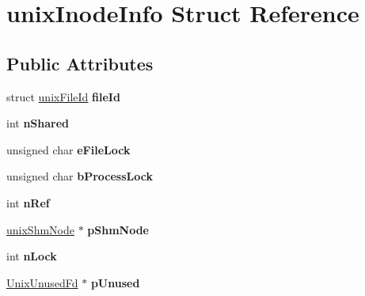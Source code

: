 \hypertarget{structunix_inode_info}{\section{unix\-Inode\-Info Struct Reference}
\label{structunix_inode_info}
}
\subsection*{Public Attributes}
\begin{DoxyCompactItemize}
\item 
\hypertarget{structunix_inode_info_ae692731d449f4462a921dda9a061faa6}{struct \hyperlink{structunix_file_id}{unix\-File\-Id} {\bfseries file\-Id}}\label{structunix_inode_info_ae692731d449f4462a921dda9a061faa6}

\item 
\hypertarget{structunix_inode_info_a0d7f8dd92964f53e59c8d741dbe00a61}{int {\bfseries n\-Shared}}\label{structunix_inode_info_a0d7f8dd92964f53e59c8d741dbe00a61}

\item 
\hypertarget{structunix_inode_info_a010a765bb3feecb16b650f68fc3a3c1f}{unsigned char {\bfseries e\-File\-Lock}}\label{structunix_inode_info_a010a765bb3feecb16b650f68fc3a3c1f}

\item 
\hypertarget{structunix_inode_info_ade689e4231dd80bb33c86da1e5ed1586}{unsigned char {\bfseries b\-Process\-Lock}}\label{structunix_inode_info_ade689e4231dd80bb33c86da1e5ed1586}

\item 
\hypertarget{structunix_inode_info_a65cbd1fd05ed00f03a252266b04a8221}{int {\bfseries n\-Ref}}\label{structunix_inode_info_a65cbd1fd05ed00f03a252266b04a8221}

\item 
\hypertarget{structunix_inode_info_a302a8b82e27d5b3624ec122bc9c2ed61}{\hyperlink{structunix_shm_node}{unix\-Shm\-Node} $\ast$ {\bfseries p\-Shm\-Node}}\label{structunix_inode_info_a302a8b82e27d5b3624ec122bc9c2ed61}

\item 
\hypertarget{structunix_inode_info_a477f3357a32adbc1a9b05017e535444d}{int {\bfseries n\-Lock}}\label{structunix_inode_info_a477f3357a32adbc1a9b05017e535444d}

\item 
\hypertarget{structunix_inode_info_a0dda9ad35734fa161d1f0b13b671c1c6}{\hyperlink{struct_unix_unused_fd}{Unix\-Unused\-Fd} $\ast$ {\bfseries p\-Unused}}\label{structunix_inode_info_a0dda9ad35734fa161d1f0b13b671c1c6}


\end{DoxyCompactItemize}
